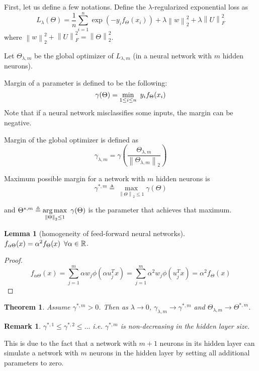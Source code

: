 \documentclass[11pt]{article}
\newtheorem{theorem}{Theorem}
\newtheorem{lemma}{Lemma}
\newtheorem{remark}{Remark}
\newcommand{\IR}{\mathbb{R}}
\newcommand{\norm}[1]{\left\lVert#1\right\rVert}
\newcommand{\normt}[1]{\left\lVert#1\right\rVert_2}
\DeclareMathOperator*{\argmax}{arg\,max}
\begin{document}
First, let us define a few notations.
Define the $\lambda$-regularized exponential loss as
$$L_\lambda (\Theta) = \frac{1}{n} \sum_{i=1}^n \exp\left(-y_i f_\Theta(x_i)\right)
	+ \lambda \normt{w}^2 + \lambda \norm{U}_F^2$$ where
$\normt{w}^2 + \norm{U}_F^2 = \normt{\Theta}^2$.

Let $\Theta_{\lambda,m}$ be the global optimizer of $L_{\lambda,m}$ (in a neural network with $m$ hidden neurons).

Margin of a parameter is defined to be the following:
$$\gamma(\Theta) = \underset{1\leq i \leq n}{\min}\enskip y_i f_\Theta(x_i)$$
Note that if a neural network misclassifies some inputs, the margin can be negative.

Margin of the global optimizer is defined as
$$\gamma_{\lambda,m}=\gamma\left(\frac{\Theta_{\lambda,m}}{\normt{\Theta_{\lambda,m}}}\right)$$

Maximum possible margin for a network with $m$ hidden neurons is 
$$\gamma^{*,m} \triangleq \underset{\normt{\Theta} \leq 1}{\max} \gamma(\Theta)$$

and
$\Theta^{*,m} \triangleq \underset{\normt{\Theta} \leq 1}{\argmax}\enskip \gamma(\Theta)$
is the parameter that achieves that maximum.

\begin{lemma}[homogeneity of feed-forward neural networks] $f_{\alpha \Theta}(x) = \alpha^2 f_\Theta(x) \enskip \forall \alpha \in \IR$.
\end{lemma}
\begin{proof}
	$$f_{\alpha \Theta}(x) = \sum\limits_{j=1}^m \alpha w_j \phi\left(\alpha u_j^Tx\right)
		= \sum\limits_{j=1}^m \alpha^2 w_j \phi\left(u_j^Tx\right)=\alpha^2f_{\Theta}(x)$$
\end{proof}

\begin{theorem}
	\label{gtz}
	Assume $\gamma^{*,m} > 0$. Then as $\lambda \rightarrow 0$,
	$\gamma_{\lambda,m} \rightarrow \gamma^{*,m}$ and $\Theta_{\lambda,m} \rightarrow \Theta^{*,m}$.
\end{theorem}

\begin{remark}
	$\gamma^{*,1} \leq \gamma^{*,2} \leq \dotso$ i.e. $\gamma^{*,m}$ is non-decreasing in the hidden layer size.
\end{remark}
This is due to the fact that a network with $m+1$ neurons in its hidden layer can
simulate a network with $m$ neurons in the hidden layer by setting all additional parameters to zero.
\end{document}
